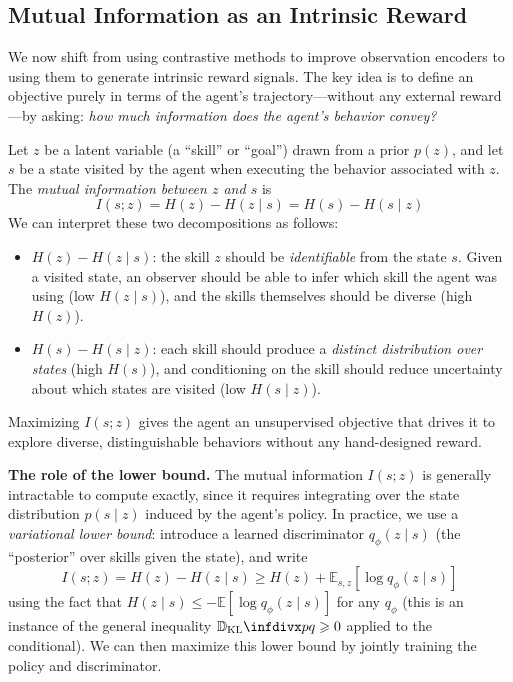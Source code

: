 \documentclass[11pt, letterpaper]{article}
\begin{document}
\subsection{Mutual Information as an Intrinsic Reward}
 
We now shift from using contrastive methods to improve observation encoders to using them to generate intrinsic reward signals. The key idea is to define an objective purely in terms of the agent's trajectory---without any external reward---by asking: \textit{how much information does the agent's behavior convey?}
 
\begin{concept}
    Let \(z\) be a latent variable (a ``skill'' or ``goal'') drawn from a prior \(p(z)\), and let \(s\) be a state visited by the agent when executing the behavior associated with \(z\). The \textit{mutual information between \(z\) and \(s\)} is
    \[
        I(s; z) = H(z) - H(z \mid s) = H(s) - H(s \mid z)
    \]
    We can interpret these two decompositions as follows:
    \begin{itemize}
        \item \(H(z) - H(z \mid s)\): the skill \(z\) should be \textit{identifiable} from the state \(s\). Given a visited state, an observer should be able to infer which skill the agent was using (low \(H(z \mid s)\)), and the skills themselves should be diverse (high \(H(z)\)).
        \item \(H(s) - H(s \mid z)\): each skill should produce a \textit{distinct distribution over states} (high \(H(s)\)), and conditioning on the skill should reduce uncertainty about which states are visited (low \(H(s \mid z)\)).
    \end{itemize}
    Maximizing \(I(s; z)\) gives the agent an unsupervised objective that drives it to explore diverse, distinguishable behaviors without any hand-designed reward.
\end{concept}
 
\begin{remark}
    \textbf{The role of the lower bound.} The mutual information \(I(s; z)\) is generally intractable to compute exactly, since it requires integrating over the state distribution \(p(s \mid z)\) induced by the agent's policy. In practice, we use a \textit{variational lower bound}: introduce a learned discriminator \(q_\phi(z \mid s)\) (the ``posterior'' over skills given the state), and write
    \[
        I(s; z) = H(z) - H(z \mid s) \geq H(z) + \mathbb{E}_{s, z}[\log q_\phi(z \mid s)]
    \]
    using the fact that \(H(z \mid s) \leq -\mathbb{E}[\log q_\phi(z \mid s)]\) for any \(q_\phi\) (this is an instance of the general inequality \(\KL{p}{q} \geq 0\) applied to the conditional). We can then maximize this lower bound by jointly training the policy and discriminator.
\end{remark}
 
\end{document}
